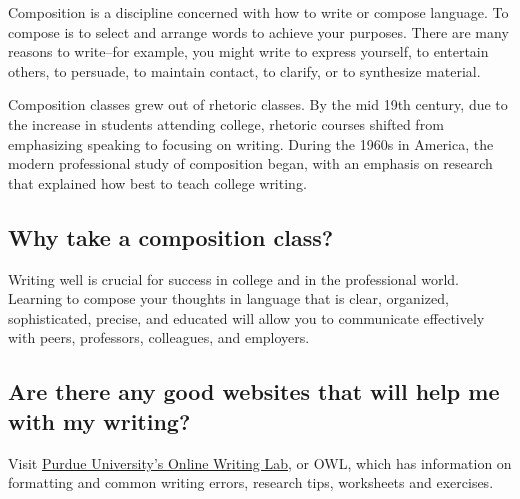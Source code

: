 Composition is a discipline concerned with how to write or compose language. To compose is to select and arrange words to achieve your purposes. There are many reasons to write--for example, you might write to express yourself, to entertain others, to persuade, to maintain contact, to clarify, or to synthesize material.

Composition classes grew out of rhetoric classes. By the mid 19th century, due to the increase in students attending college, rhetoric courses shifted from emphasizing speaking to focusing on writing. During the 1960s in America, the modern professional study of composition began, with an emphasis on research that explained how best to teach college writing.
 
\subsection{Why take a composition class?}

Writing well is crucial for success in college and in the professional world. Learning to compose your thoughts in language that is clear, organized, sophisticated, precise, and educated will allow you to communicate effectively with peers, professors, colleagues, and employers.


\subsection{Are there any good websites that will help me with my writing?}
Visit \href{http://owl.english.purdue.edu}{Purdue University's Online Writing Lab}, or OWL, which has information on formatting and common writing errors, research tips, worksheets and exercises.



